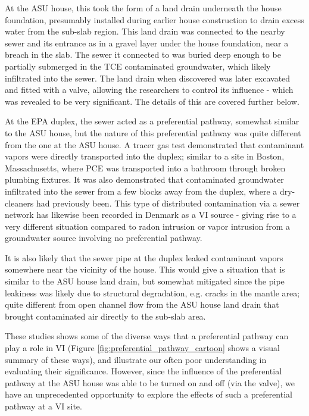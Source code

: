 At the ASU house, this took the form of a land drain underneath the house foundation, presumably installed during earlier house construction to drain excess water from the sub-slab region.
This land drain was connected to the nearby sewer and its entrance as in a gravel layer under the house foundation, near a breach in the slab.
The sewer it connected to was buried deep enough to be partially submerged in the TCE contaminated groundwater, which likely infiltrated into the sewer.
The land drain when discovered was later excavated and fitted with a valve, allowing the researchers to control its influence - which was revealed to be very significant\cite{guo_identification_2015}.
The details of this are covered further below.\par

At the EPA duplex, the sewer acted as a preferential pathway, somewhat similar to the ASU house, but the nature of this preferential pathway was quite different from the one at the ASU house.
A tracer gas test demonstrated that contaminant vapors were directly transported into the duplex\cite{mchugh_evidence_2017}; similar to a site in Boston, Massachusetts, where PCE was transported into a bathroom through broken plumbing fixtures\cite{pennell_sewer_2013}.
It was also demonstrated that contaminated groundwater infiltrated into the sewer from a few blocks away from the duplex, where a dry-cleaners had  previously been.
This type of distributed contamination via a sewer network has likewise been recorded in Denmark\cite{nielsen_remediation_2017} as a VI source - giving rise to a very different situation compared to radon intrusion or vapor intrusion from a groundwater source involving no preferential pathway.\par

It is also likely that the sewer pipe at the duplex leaked contaminant vapors somewhere near the vicinity of the house.
This would give a situation that is similar to the ASU house land drain, but somewhat mitigated since the pipe leakiness was likely due to structural degradation, e.g. cracks in the mantle area; quite different from open channel flow from the ASU house land drain that brought contaminated air directly to the sub-slab area.\par

These studies shows some of the diverse ways that a preferential pathway can play a role in VI (Figure \ref{fig:preferential_pathway_cartoon} shows a visual summary of these ways), and illustrate our often poor understanding in evaluating their significance.
However, since the influence of the preferential pathway at the ASU house was able to be turned on and off (via the valve), we have an unprecedented opportunity to explore the effects of such a preferential pathway at a VI site.\par

